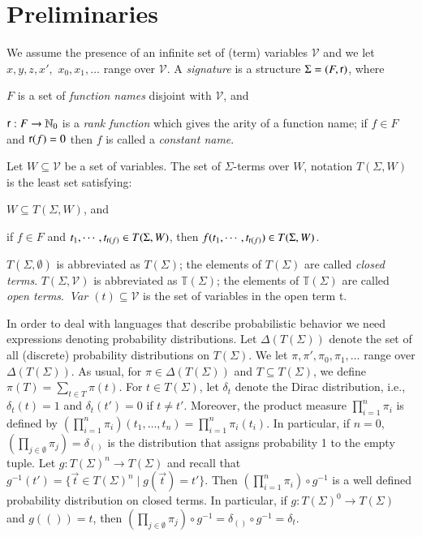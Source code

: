\documentclass[submission,copyright,creativecommons]{eptcs}
\newcommand{\N}{\mathbb{N}} \newcommand{\Z}{\mathbb{Z}} \newcommand{\Q}{\mathbb{Q}} \newcommand{\R}{\mathbb{R}}
\newcommand{\rank}{\mathop{\sf r}}
\newcommand{\openT}{\mathbb{T}}
\newcommand{\openTerms}{\openT(\Sigma)}
\newcommand{\closedTerms}{T(\Sigma)}
\newcommand{\Var}{\mathop{\textit{Var}}}
\newcommand{\TVar}{\mathcal{V}}
\begin{document}
\section{Preliminaries}\label{sec:preliminaries}






We assume the presence of an infinite set of (term) variables $\TVar$ and
we let $x, y, z, x',$ $x_0, x_1, \ldots$ range over $\TVar$.
A \emph{signature} is a structure $\Sigma = (F, \rank)$, where 
\begin{inparaenum}[(i)]
\item $F$ is a set of \emph{function names} disjoint with $\TVar$, and
\item $\rank : F \to \N_0$ is a \emph{rank function} which gives the arity 
  of a function name; if $f \in F$ and $\rank(f)=0$ then $f$ is called
  a \emph{constant name}.
\end{inparaenum}
Let $W \subseteq \TVar$ be a set of variables. The set of $\Sigma$-terms 
over $W$, notation $T(\Sigma, W)$ is the least set satisfying: 
\begin{inparaenum}[(i)]
\item $W \subseteq T(\Sigma, W)$, and
\item if $f \in F$ and $t_1, \cdots, t_{\rank(f)} \in T(\Sigma, W)$, then
  $f (t_1, \cdots, t_{\rank(f)}) \in T(\Sigma, W)$.
\end{inparaenum}
$T(\Sigma, \emptyset)$ is abbreviated as $\closedTerms$; the elements
of $\closedTerms$ are called \emph{closed terms}. $T(\Sigma, \TVar)$ is
abbreviated as $\openTerms$; the elements of $\openTerms$ are called
\emph{open terms}. $\Var(t) \subseteq \TVar$ is the set of variables in
the open term t. 



In order to deal with languages that describe probabilistic behavior we need expressions denoting probability distributions.
Let $\Delta(\closedTerms)$ denote the set of all (discrete) probability
distributions on $\closedTerms$.
We let $\pi, \pi', \pi_0, \pi_1, \ldots$ range over
$\Delta(\closedTerms)$.
As usual, for $\pi \in \Delta(\closedTerms)$ and $T \subseteq
\closedTerms$, we define $\pi(T)=\sum_{t\in T}\pi(t)$.
For $t \in \closedTerms$, let $\delta_t$ denote the Dirac
distribution, i.e., $\delta_t(t)=1$ and  $\delta_t(t')=0$ if $t\not=t'$.
Moreover, the product measure $\prod_{i=1}^n\pi_i$ is defined by
$(\prod_{i=1}^n\pi_i)(t_1,\ldots,t_n)=\prod_{i=1}^n\pi_i(t_i)$. In
particular, if $n=0$, $(\prod_{j\in\emptyset}\pi_j) = \delta_{()}$ is
the distribution that assigns probability 1 to the empty tuple.
Let $g:\closedTerms^n\to\closedTerms$ and recall that 
$g^{-1}(t') = \{ \vec{t} \in\closedTerms^n \mid g(\vec{t})=t'\}$.  Then
$(\prod_{i=1}^n\pi_i)\circ g^{-1}$ is a well defined probability
distribution on closed terms.
In particular, if $g:\closedTerms^0\to\closedTerms$ and $g(())=t$, 
then $(\prod_{j\in\emptyset}\pi_j) \circ g^{-1} = \delta_{()} \circ g^{-1} = \delta_{t}$.
\end{document}
